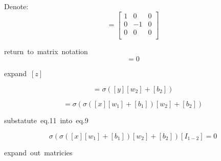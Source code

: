 \documentclass{article}
\begin{document}
\hbox{Denote: }
\begin{equation}
    [I_{1-2}] = \begin{bmatrix}   
        1 & 0 & 0 \\
        0 & -1 & 0 \\
        0 & 0 & 0 \\
        \end{bmatrix}
\end{equation}

\hbox{return to matrix notation}
\begin{equation}
    [z][I_{1-2}] = 0
\end{equation}


\hbox{expand $[z]$}

\begin{equation}
    [z] = \sigma([y][w_2] + [b_2])
\end{equation}

\begin{equation}
    [z] = \sigma(
            \sigma([x][w_1] + [b_1])
        [w_2] + [b_2])
\end{equation}

\hbox{substatute eq.11 into eq.9}

\begin{equation}
    \sigma(
            \sigma([x][w_1] + [b_1])
        [w_2] + [b_2])[I_{1-2}] = 0
\end{equation}

\hbox{expand out matricies}
\end{document}
